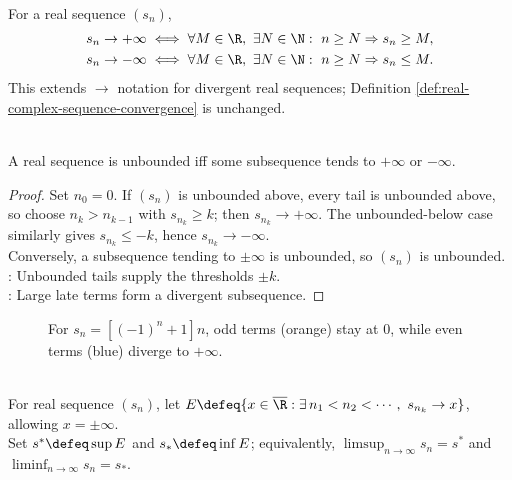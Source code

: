 \begin{definition} \label{def:sequence-diverges-to-infinity} \\
For a real sequence $(s_n)$,
\begin{align}
s_n\to+\infty &\iff \forall M\in\R,\ \exists N\in\N:\ n\geq N\Rightarrow s_n\geq M, \nonumber\\
s_n\to-\infty &\iff \forall M\in\R,\ \exists N\in\N:\ n\geq N\Rightarrow s_n\leq M. \nonumber
\end{align}
This extends $\to$ notation for divergent real sequences; Definition \ref{def:real-complex-sequence-convergence} is unchanged.
\end{definition}

\begin{proposition} \label{prop:unbounded-real-sequence-has-infinite-subsequence} \\
A real sequence is unbounded iff some subsequence tends to $+\infty$ or $-\infty$.
\begin{proof}
Set $n_0=0$. If $(s_n)$ is unbounded above, every tail is unbounded above, so choose $n_k>n_{k-1}$ with $s_{n_k}\geq k$; then $s_{n_k}\to+\infty$. The unbounded-below case similarly gives $s_{n_k}\leq-k$, hence $s_{n_k}\to-\infty$.\\
Conversely, a subsequence tending to $\pm\infty$ is unbounded, so $(s_n)$ is unbounded.\\
: Unbounded tails supply the thresholds $\pm k$.\\
: Large late terms form a divergent subsequence.
\end{proof}
\end{proposition}

\begin{figure}[H]
  \centering
  
  \caption{For $s_n=[(-1)^n+1]n$, odd terms (orange) stay at $0$, while even terms (blue) diverge to $+\infty$.}
  \label{fig:limsup-extended-subsequences}
\end{figure}

\begin{definition} \label{def:upper-and-lower-limits} \\
For real sequence $(s_n)$, let $E\defeq\{x\in\overline{\R}:\exists\, n_1<n_2<\cdots,\ s_{n_k}\to x\}$, allowing $x=\pm\infty$.\\
Set $s^*\defeq\sup E$ and $s_*\defeq\inf E$; equivalently, $\limsup_{n\to\infty}s_n=s^*$ and $\liminf_{n\to\infty}s_n=s_*$.
\end{definition}

